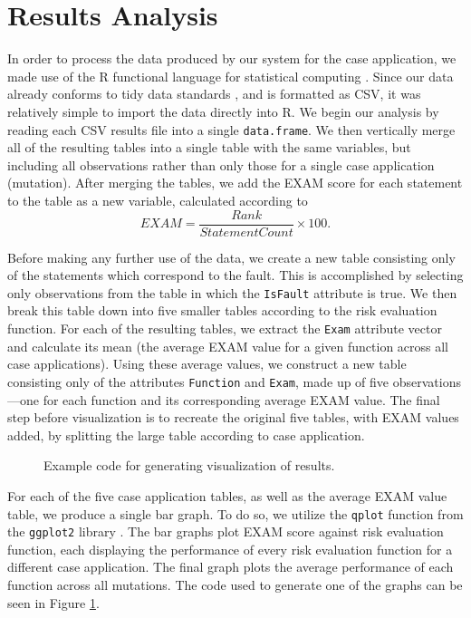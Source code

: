 \section{Results Analysis}\label{sec:data}

In order to process the data produced by our system for the case application, we made use of the
R functional language for statistical computing \cite{r}.  Since our data already conforms
to tidy data standards \cite{tidy}, and is formatted as CSV, it was relatively simple to import the
data directly into R.  We begin our analysis by reading each CSV results file into a single 
\texttt{data.frame}.  We then vertically merge all of the resulting tables into a single table with
the same variables, but including all observations rather than only those for a single case 
application (mutation).  After merging the tables, we add the EXAM score for each statement to the table 
as a new variable, calculated according to \[EXAM = \frac{Rank}{StatementCount} \times 100.\]

Before making any further use of the data, we create a new table consisting only of the statements
which correspond to the fault.  This is accomplished by selecting only observations from the table
in which the \texttt{IsFault} attribute is true.  We then break this table down into five smaller tables according to the risk evaluation function.  For each of the resulting tables, we extract the 
\texttt{Exam} attribute vector and calculate its mean (the average EXAM value for a given function
across all case applications).  Using these average values, we construct a new table consisting only
of the attributes \texttt{Function} and \texttt{Exam}, made up of five observations---one for each
function and its corresponding average EXAM value.  The final step before visualization is to 
recreate the original five tables, with EXAM values added, by splitting the large table according to
case application.

\begin{figure}[tb]
\centering

\caption{Example code for generating visualization of results.}
\label{fig:rgraph}
\end{figure}

For each of the five case application tables, as well as the average EXAM value table, we produce a
single bar graph.  To do so, we utilize the \texttt{qplot} function from the \texttt{ggplot2} library
\cite{ggplot2}.  The bar graphs plot EXAM score against risk evaluation function, each displaying the
performance of every risk evaluation function for a different case application.  The final graph plots
the average performance of each function across all mutations.  The code used to generate one of the
graphs can be seen in Figure \ref{fig:rgraph}.

